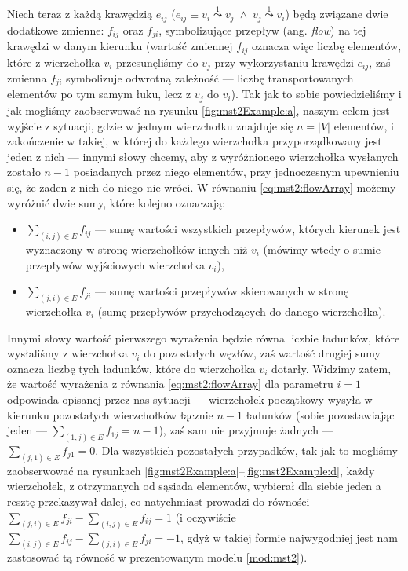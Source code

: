 Niech teraz z każdą krawędzią $e_{ij}$ ($e_{ij} \equiv v_{i} \overset{1}{\leadsto} v_{j} \; \wedge \; v_{j} \overset{1}{\leadsto} v_{i}$) będą związane dwie dodatkowe zmienne: $f_{ij}$ oraz $f_{ji}$, symbolizujące przepływ (ang. \textit{flow}) na tej krawędzi w danym kierunku (wartość zmiennej $f_{ij}$ oznacza więc liczbę elementów, które z wierzchołka $v_{i}$ przesunęliśmy do $v_{j}$ przy wykorzystaniu krawędzi $e_{ij}$, zaś zmienna $f_{ji}$ symbolizuje odwrotną zależność --- liczbę transportowanych elementów po tym samym łuku, lecz z $v_{j}$ do $v_{i}$). Tak jak to sobie powiedzieliśmy i jak mogliśmy zaobserwować na rysunku \ref{fig:mst2Example:a}, naszym celem jest wyjście z sytuacji, gdzie w jednym wierzchołku znajduje się $n = \left| V \right|$ elementów, i zakończenie w takiej, w której do każdego wierzchołka przyporządkowany jest jeden z nich --- innymi słowy chcemy, aby z wyróżnionego wierzchołka wysłanych zostało $n - 1$ posiadanych przez niego elementów, przy jednoczesnym upewnieniu się, że żaden z nich do niego nie wróci. W równaniu \ref{eq:mst2:flowArray} możemy wyróżnić dwie sumy, które kolejno oznaczają:

\begin{itemize}
	\item $\sum_{ \left( i, j \right ) \in E } f_{ij}$ --- sumę wartości wszystkich przepływów, których kierunek jest wyznaczony w stronę wierzchołków innych niż $v_{i}$ (mówimy wtedy o sumie przepływów wyjściowych wierzchołka $v_{i}$),
	\item $\sum_{ \left( j, i \right ) \in E } f_{ji}$ --- sumę wartości przepływów skierowanych w stronę wierzchołka $v_{i}$ (sumę przepływów przychodzących do danego wierzchołka).
\end{itemize}

Innymi słowy wartość pierwszego wyrażenia będzie równa liczbie ładunków, które wysłaliśmy z wierzchołka $v_{i}$ do pozostałych węzłów, zaś wartość drugiej sumy oznacza liczbę tych ładunków, które do wierzchołka $v_{i}$ dotarły. Widzimy zatem, że wartość wyrażenia z równania \ref{eq:mst2:flowArray} dla parametru $i = 1$ odpowiada opisanej przez nas sytuacji --- wierzchołek początkowy wysyła w kierunku pozostałych wierzchołków łącznie $n - 1$ ładunków (sobie pozostawiając jeden --- $\sum_{ \left( 1, j \right ) \in E } f_{1j} = n - 1$), zaś sam nie przyjmuje żadnych --- $\sum_{ \left( j, 1 \right ) \in E } f_{j1} = 0$. Dla wszystkich pozostałych przypadków, tak jak to mogliśmy zaobserwować na rysunkach \ref{fig:mst2Example:a}--\ref{fig:mst2Example:d}, każdy wierzchołek, z otrzymanych od sąsiada elementów, wybierał dla siebie jeden a resztę przekazywał dalej, co natychmiast prowadzi do równości $\sum_{ \left( j, i \right ) \in E } f_{ji} - \sum_{ \left( i, j \right ) \in E } f_{ij} = 1$ (i oczywiście $\sum_{ \left( i, j \right ) \in E } f_{ij} - \sum_{ \left( j, i \right ) \in E } f_{ji} = -1$, gdyż w takiej formie najwygodniej jest nam zastosować tą równość w prezentowanym modelu \ref{mod:mst2}).

